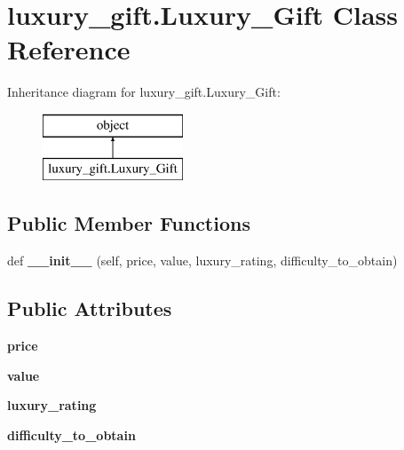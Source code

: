 \hypertarget{classluxury__gift_1_1_luxury___gift}{}\section{luxury\+\_\+gift.\+Luxury\+\_\+\+Gift Class Reference}
\label{classluxury__gift_1_1_luxury___gift}
Inheritance diagram for luxury\+\_\+gift.\+Luxury\+\_\+\+Gift\+:\begin{figure}[H]
\begin{center}
\leavevmode
\includegraphics[height=2.000000cm]{classluxury__gift_1_1_luxury___gift}
\end{center}
\end{figure}
\subsection*{Public Member Functions}
\begin{DoxyCompactItemize}
\item 
\mbox{\label{classluxury__gift_1_1_luxury___gift_ab93b10ec0683264d2c821a4963dd1dd2}} 
def {\bfseries \+\_\+\+\_\+init\+\_\+\+\_\+} (self, price, value, luxury\+\_\+rating, difficulty\+\_\+to\+\_\+obtain)
\end{DoxyCompactItemize}
\subsection*{Public Attributes}
\begin{DoxyCompactItemize}
\item 
\mbox{\label{classluxury__gift_1_1_luxury___gift_a89a67981fa5bffe37e0b241ee35aa706}} 
{\bfseries price}
\item 
\mbox{\label{classluxury__gift_1_1_luxury___gift_a1b6c2d6dc038915cc36ff40707b7bd1f}} 
{\bfseries value}
\item 
\mbox{\label{classluxury__gift_1_1_luxury___gift_a6663d4dd880f62c54414f404de3c6643}} 
{\bfseries luxury\+\_\+rating}
\item 
\mbox{\label{classluxury__gift_1_1_luxury___gift_a585dc4d044e9bac12b7691aa8fd56076}} 
{\bfseries difficulty\+\_\+to\+\_\+obtain}
\end{DoxyCompactItemize}


